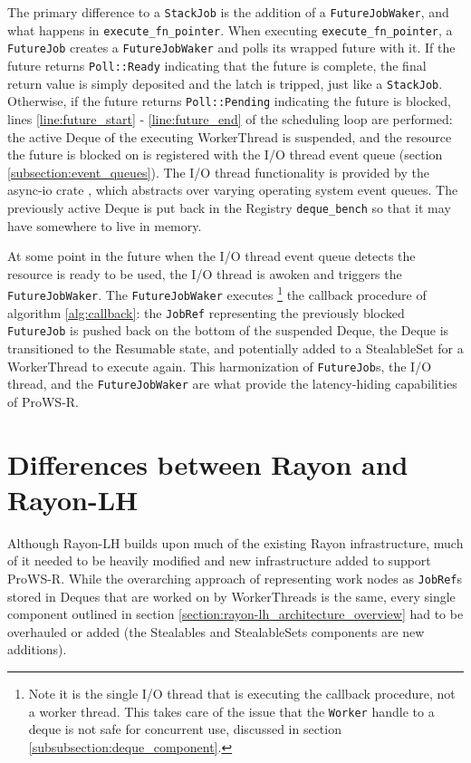\documentclass[bsc,frontabs,singlespacing,parskip,deptreport,normalheadings]{infthesis}
\begin{document}
The primary difference to a \texttt{StackJob} is the addition of a
\texttt{FutureJobWaker}, and what happens in \texttt{execute\_fn\_pointer}. When
executing \texttt{execute\_fn\_pointer}, a \texttt{FutureJob} creates a
\texttt{FutureJobWaker} and polls its wrapped future with it. If the future
returns \texttt{Poll::Ready} indicating that the future is complete, the final
return value is simply deposited and the latch is tripped, just like a
\texttt{StackJob}. Otherwise, if the future returns \texttt{Poll::Pending}
indicating the future is blocked, lines \ref{line:future_start} -
\ref{line:future_end} of the scheduling loop are performed: the active Deque of
the executing WorkerThread is suspended, and the resource the future is blocked
on is registered with the I/O thread event queue (section
\ref{subsection:event_queues}). The I/O thread functionality is provided by the
async-io crate \cite{noauthor_async-io_2022}, which abstracts over varying
operating system event queues. The previously active Deque is put back in the
Registry \texttt{deque\_bench} so that it may have somewhere to live in memory.

At some point in the future when the I/O thread event queue detects the resource
is ready to be used, the I/O thread is awoken and triggers the
\texttt{FutureJobWaker}. The \texttt{FutureJobWaker} executes \footnote{Note it
    is the single I/O thread that is executing the callback procedure, not a
    worker thread. This takes care of the issue that the \texttt{Worker} handle
to a deque is not safe for concurrent use, discussed in section
\ref{subsubsection:deque_component}.} the callback procedure of algorithm
\ref{alg:callback}: the \texttt{JobRef} representing the previously blocked
\texttt{FutureJob} is pushed back on the bottom of the suspended Deque, the
Deque is transitioned to the Resumable state, and potentially added to a
StealableSet for a WorkerThread to execute again. This harmonization of
\texttt{FutureJob}s, the I/O thread, and the \texttt{FutureJobWaker} are what
provide the latency-hiding capabilities of ProWS-R.

\section{Differences between Rayon and Rayon-LH}
\label{section:differences_between_rayon_and_rayon-lh}

Although Rayon-LH builds upon much of the existing Rayon infrastructure, much of
it needed to be heavily modified and new infrastructure added to support
ProWS-R. While the overarching approach of representing work nodes as
\texttt{JobRef}s stored in Deques that are worked on by WorkerThreads is the
same, every single component outlined in section
\ref{section:rayon-lh_architecture_overview} had to be overhauled or added (the
Stealables and StealableSets components are new additions).
\end{document}
